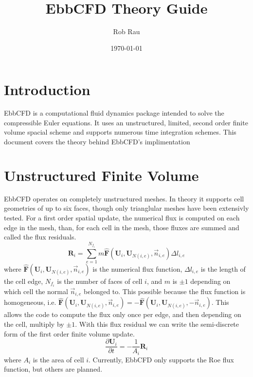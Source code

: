 \documentclass[12pt,parskip=full]{article}
\numberwithin{subsection}{section}
\begin{document}
	\vspace{-4ex}
	\title{EbbCFD Theory Guide\vspace{-3.5ex}}
	\author{Rob Rau\vspace{-4ex}}
	\date{\today\vspace{-4ex}}
	\maketitle

	\section{Introduction}
		EbbCFD is a computational fluid dynamics package intended to solve the compressible Euler equations.
		It uses an unstructured, limited, second order finite volume spacial scheme and supports numerous
		time integration schemes. This document covers the theory behind EbbCFD's implimentation

	\section{Unstructured Finite Volume}
		EbbCFD operates on completely unstructured meshes. In theory it supports cell geometries of up to six faces,
		though only trianglular meshes have been extensivly tested. For a first order spatial update, the numerical flux
		is computed on each edge in the mesh, than, for each cell in the mesh, those fluxes are summed and called the
		flux residuals.
		\begin{equation}
			\mathbf{R}_i = \sum_{e = 1}^{N_{f_i}}{m\mathbf{\hat{F}}(\mathbf{U}_i, \mathbf{U}_{N(i,e)}, \vec{n}_{i,e}) \Delta l_{i,e}}
		\end{equation}
		where $\mathbf{\hat{F}}(\mathbf{U}_i, \mathbf{U}_{N(i,e)}, \vec{n}_{i,e})$ is the numerical flux function,
		$\Delta l_{i,e}$ is the length of the cell edge, $N_{f_i}$ is the number of faces of cell $i$, and $m$ is $\pm 1$
		depending on which cell the normal $\vec{n}_{i,e}$ belonged to. This possible because the flux function is homogeneous, i.e.
		$\mathbf{\hat{F}}(\mathbf{U}_i, \mathbf{U}_{N(i,e)}, \vec{n}_{i,e}) = -\mathbf{\hat{F}}(\mathbf{U}_i, \mathbf{U}_{N(i,e)}, -\vec{n}_{i,e})$.
		This allows the code to compute the flux only once per edge, and then depending on the cell, multiply by $\pm 1$.
		With this flux residual we can write the semi-discrete form of the first order finite volume update.
		\begin{equation}
			\frac{\partial \mathbf{U}_i}{\partial t} = -\frac{1}{A_i}\mathbf{R}_i
		\end{equation}
		where $A_i$ is the area of cell $i$. Currently, EbbCFD only supports the Roe flux function, but others are planned.
\end{document}
